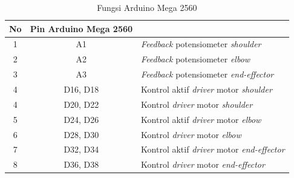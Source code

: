 \begin{longtable}{|c|c|l|}
	\caption{Fungsi Arduino Mega 2560}
	\label{tbl.pinarduino}\\
	\hline
	\rowcolor[HTML]{656565} 
	{\color[HTML]{000000} No} & {\color[HTML]{000000} Pin Arduino Mega 2560} & \multicolumn{1}{c|}{\cellcolor[HTML]{656565}{\color[HTML]{000000} Fungsi}} \\ \hline
	\endfirsthead
	\endhead
	1                         & A1                                 & \textit{Feedback} potensiometer \textit{shoulder}                                            \\ \hline
	2                         & A2                                 & \textit{Feedback} potensiometer \textit{elbow}                                               \\ \hline
	3                         & A3                                 & {\color[HTML]{000000} \textit{Feedback} potensiometer \textit{end-effector}}                 \\ \hline
	4                         & D16, D18                           & Kontrol aktif \textit{driver} motor \textit{shoulder}                                        \\ \hline
	4                         & D20, D22                           & Kontrol \textit{driver} motor \textit{shoulder}                                              \\ \hline
	5                         & D24, D26                           & Kontrol aktif \textit{driver} motor \textit{elbow}                                           \\ \hline
	6                         & D28, D30                           & Kontrol \textit{driver} motor \textit{elbow}                                                 \\ \hline
	7                         & D32, D34                           & Kontrol aktif \textit{driver} motor \textit{end-effector  }                                  \\ \hline
	8                         & D36, D38                           & Kontrol \textit{driver} motor \textit{end-effector }                                         \\ \hline

\end{longtable}
